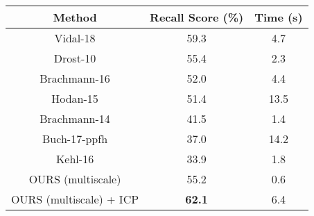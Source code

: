 \documentclass[letterpaper, 10 pt, conference]{ieeeconf}  %
\begin{document}
    \centering
        \begin{adjustbox}{center, margin=0 0 0 20px}  
        \begin{tabular}{|c|c|c|}
        \hline 
        \textbf{Method} & \textbf{Recall Score (\%)} & \textbf{Time (s)}\\
        \hline
        Vidal-18 \cite{vidal20186d} & 59.3 & 4.7 \\
        Drost-10 \cite{drost2010model} & 55.4 & 2.3 \\
        Brachmann-16 \cite{brachmann2016uncertainty} & 52.0 & 4.4 \\
        Hodan-15 \cite{hodavn2015detection} & 51.4 & 13.5 \\
        Brachmann-14 \cite{brachmann2014learning} & 41.5 & 1.4 \\
        Buch-17-ppfh \cite{buch2017rotational} & 37.0 & 14.2 \\
        Kehl-16 \cite{kehl2016deep} & 33.9 & 1.8 \\
        \hline
        OURS (multiscale) & 55.2 & 0.6 \\
        OURS (multiscale) + ICP & \textbf{62.1} & 6.4 \\
        \hline
        \end{tabular}
        \end{adjustbox}
        \label{table_vsd}
        \vspace{-0.25cm}
\end{document}
